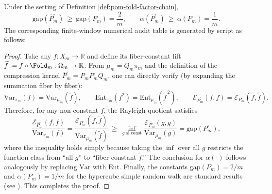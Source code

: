 \begin{theorem}\label{thm:pom-fold-factor-chain-gap-lsi}
Under the setting of Definition \ref{def:pom-fold-factor-chain},
\[
\mathrm{gap}(\overline P^{\square}_m)\ \ge\ \mathrm{gap}(P^{\square}_m)=\frac{2}{m},
\qquad
\alpha(\overline P^{\square}_m)\ \ge\ \alpha(P^{\square}_m)=\frac{1}{m}.
\]
The corresponding finite-window numerical audit table is generated by script as follows:

\end{theorem}
\begin{proof}
Take any \(f:X_m\to\mathbb R\) and define its fiber-constant lift \(\widetilde f:=f\circ \Fold_m:\Omega_m\to\mathbb R\).
From \(\mu_m=Q_m\pi_m\) and the definition of the compression kernel \(\overline P^{\square}_m=P_mP^{\square}_mQ_m\),
one can directly verify (by expanding the summation fiber by fiber):
\[
\mathrm{Var}_{\pi_m}(f)=\mathrm{Var}_{\mu_m}(\widetilde f),\qquad
\mathrm{Ent}_{\pi_m}(f^2)=\mathrm{Ent}_{\mu_m}(\widetilde f^{\,2}),
\qquad
\mathcal E_{\overline P^{\square}_m}(f,f)=\mathcal E_{P^{\square}_m}(\widetilde f,\widetilde f).
\]
Therefore, for any non-constant \(f\), the Rayleigh quotient satisfies
\[
\frac{\mathcal E_{\overline P^{\square}_m}(f,f)}{\mathrm{Var}_{\pi_m}(f)}
=
\frac{\mathcal E_{P^{\square}_m}(\widetilde f,\widetilde f)}{\mathrm{Var}_{\mu_m}(\widetilde f)}
\ \ge\
\inf_{g\not\equiv \mathrm{const}}\frac{\mathcal E_{P^{\square}_m}(g,g)}{\mathrm{Var}_{\mu_m}(g)}
=\mathrm{gap}(P^{\square}_m),
\]
where the inequality holds simply because taking the \(\inf\) over all \(g\) restricts the function class from ``all \(g\)'' to ``fiber-constant \(\widetilde f\).''
The conclusion for \(\alpha(\cdot)\) follows analogously by replacing \(\mathrm{Var}\) with \(\mathrm{Ent}\).
Finally, the constants \(\mathrm{gap}(P^{\square}_m)=2/m\) and \(\alpha(P^{\square}_m)=1/m\) for the hypercube simple random walk are standard results (see \cite{LevinPeresWilmer2009MarkovMixing}). This completes the proof.
\end{proof}







